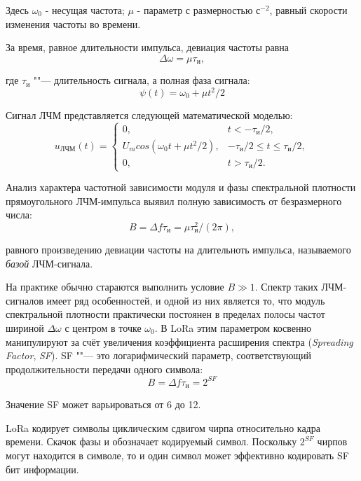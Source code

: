 Здесь $\omega_0$ - несущая частота; $\mu$ - параметр с размерностью с$^{-2}$, равный скорости изменения частоты во времени.

За время, равное длительности импульса, девиация частоты равна
\begin{equation}
	\Delta \omega = \mu \tau_{\text{и}},
\end{equation}

где $\tau_{\text{и}}$ ""--- длительность сигнала, а полная фаза сигнала:
\begin{equation}
	\psi(t) = \omega_0 + \mu t{^2}/2
\end{equation}

Сигнал ЛЧМ представляется следующей математической моделью\cite{Baskakov2003}:
\begin{equation}
	u_\text{ЛЧМ}(t) = 
	\begin{cases}
		0, & t < -\tau_\text{и}/2,\\
		U_m cos(\omega_0 t + \mu t{^2}/2), & -\tau_\text{и}/2 \le t \le \tau_\text{и}/2,\\
		0, & t > \tau_\text{и}/2.
	\end{cases}
\end{equation}

Анализ характера частотной зависимости модуля и фазы спектральной плотности прямоугольного ЛЧМ-импульса выявил\cite{Baskakov2003} полную зависимость от безразмерного числа:
\begin{equation}
	B = \Delta f \tau_\text{и} = \mu \tau^{2}_{\text{и}}/(2\pi),
\end{equation}

равного произведению девиации частоты на длительноть импульса, называемого \textit{базой} ЛЧМ-сигнала.

На практике обычно стараются выполнить условие $B \gg 1$. 
Спектр таких ЛЧМ-сигналов имеет ряд особенностей, и одной из них является то, что модуль спектральной плотности практически постоянен в пределах полосы частот шириной $\Delta \omega$ с центром в точке $\omega_0$.
В LoRa этим параметром косвенно манипулируют за счёт увеличения коэффициента расширения спектра (\textit{Spreading Factor}, \textit{SF}).
SF ""--- это логарифмический параметр, соответствующий продолжительности передачи одного символа:
\begin{equation}
	B = \Delta f \tau_\text{и} = 2^{SF}
\end{equation}

Значение SF может варьироваться от 6 до 12.

LoRa кодирует символы циклическим сдвигом чирпа относительно кадра времени. 
Скачок фазы и обозначает кодируемый символ.
Поскольку $2^{SF}$ чирпов могут находится в символе, то и один символ может эффективно кодировать SF бит информации.


